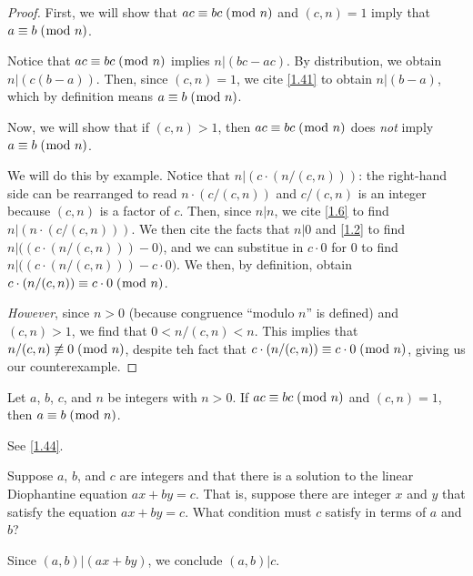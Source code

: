 \documentclass[../main.tex]{subfiles}
\begin{document}
\begin{proof}
  First, we will show that $ac \equiv bc \; (\bmod \; n)$ and $(c, n) = 1$ imply that $a \equiv b \; (\bmod \; n)$.

  Notice that $ac \equiv bc \; (\bmod \; n)$ implies $n | (bc - ac)$. By distribution, we obtain $n | \left( c (b - a) \right)$. Then, since $(c, n) = 1$, we cite \ref{1.41} to obtain $n | (b - a)$, which by definition means $a \equiv b \; (\bmod \; n)$.

  Now, we will show that if $(c, n) > 1$, then $ac \equiv bc \; (\bmod \; n)$ does \emph{not} imply $a \equiv b \; (\bmod \; n)$.

  We will do this by example. Notice that $n | \left( c \cdot (n / (c, n)) \right)$: the right-hand side can be rearranged to read $n \cdot (c / (c, n))$ and $c / (c, n)$ is an integer because $(c, n)$ is a factor of $c$. Then, since $n|n$, we cite \ref{1.6} to find $n | \left( n \cdot (c / (c, n)) \right)$.
  We then cite the facts that $n | 0$ and \ref{1.2} to find $n | \big( (c \cdot (n / (c, n))) - 0 \big)$, and we can substitue in $c \cdot 0$ for $0$ to find $n | \big( (c \cdot (n / (c, n))) - c \cdot 0 \big)$. We then, by definition, obtain $c \cdot (n / (c, n)) \equiv c \cdot 0 \; (\bmod \; n)$.

  \emph{However}, since $n > 0$ (because congruence ``modulo $n$'' is defined) and $(c, n) > 1$, we find that $0 < n / (c, n) < n$. This implies that $n / (c, n) \not\equiv 0 \; (\bmod \; n)$, despite teh fact that $c \cdot (n / (c, n)) \equiv c \cdot 0 \; (\bmod \; n)$, giving us our counterexample.
\end{proof}



\begin{thm} \label{1.45}
  Let $a$, $b$, $c$, and $n$ be integers with $n > 0$. If $ac \equiv bc \; (\bmod \; n)$ and $(c, n) = 1$, then $a \equiv b \; (\bmod \; n)$.
\end{thm}

See \ref{1.44}.



\begin{ques} \label{1.46}
  Suppose $a$, $b$, and $c$ are integers and that there is a solution to the linear Diophantine equation $ax + by = c$. That is, suppose there are integer $x$ and $y$ that satisfy the equation $ax + by = c$. What condition must $c$ satisfy in terms of $a$ and $b$?
\end{ques}

Since $(a, b) | (ax + by)$, we conclude $(a, b) | c$.
\end{document}
